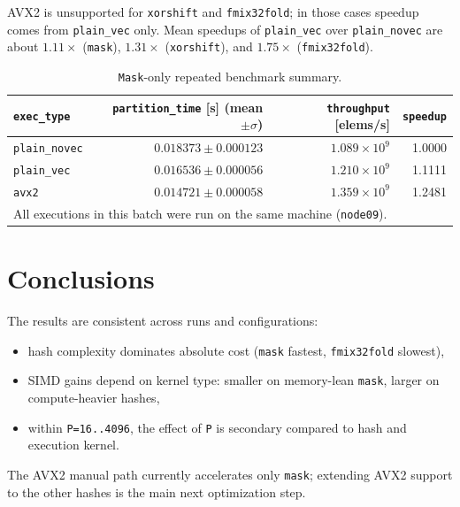 \documentclass[11pt,a4paper]{article}
\begin{document}
AVX2 is unsupported for \texttt{xorshift} and \texttt{fmix32fold}; in those cases speedup comes from \texttt{plain\_vec} only. Mean speedups of \texttt{plain\_vec} over \texttt{plain\_novec} are about \(1.11\times\) (\texttt{mask}), \(1.31\times\) (\texttt{xorshift}), and \(1.75\times\) (\texttt{fmix32fold}).

\begin{table}[H]
    \centering
    \begin{tabular}{lrrr}
        \toprule
        \texttt{exec\_type} & \texttt{partition\_time} [s] (mean $\pm \sigma$) & \texttt{throughput} [elems/s] & \texttt{speedup} \\
        \midrule
        \texttt{plain\_novec} & $0.018373 \pm 0.000123$ & $1.089 \times 10^9$ & 1.0000 \\
        \texttt{plain\_vec}   & $0.016536 \pm 0.000056$ & $1.210 \times 10^9$ & 1.1111 \\
        \texttt{avx2}         & $0.014721 \pm 0.000058$ & $1.359 \times 10^9$ & 1.2481 \\
        \midrule
        \multicolumn{4}{l}{All executions in this batch were run on the same machine (\texttt{node09}).} \\
        \bottomrule
    \end{tabular}
    \caption{\texttt{Mask}-only repeated benchmark summary.}
    \label{tab:exec-summary}
\end{table}

\section{Conclusions}
The results are consistent across runs and configurations:
\begin{itemize}
    \item hash complexity dominates absolute cost (\texttt{mask} fastest, \texttt{fmix32fold} slowest),
    \item SIMD gains depend on kernel type: smaller on memory-lean \texttt{mask}, larger on compute-heavier hashes,
    \item within \texttt{P=16..4096}, the effect of \texttt{P} is secondary compared to hash and execution kernel.
\end{itemize}

The AVX2 manual path currently accelerates only \texttt{mask}; extending AVX2 support to the other hashes is the main next optimization step.
\end{document}
